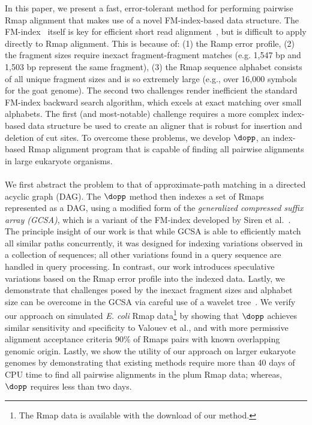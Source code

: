 \documentclass[doctor]{thesis}
\begin{document}
In this paper, we present a fast, error-tolerant method for performing pairwise Rmap alignment that makes use of a novel FM-index-based data structure. The FM-index~\cite{fm2005} itself is key for efficient short read alignment~\cite{BWA,bowtie}, but is difficult to apply directly to Rmap alignment.  This is because of: (1) the Ramp error profile, (2) the fragment sizes require inexact fragment-fragment matches (e.g. 1,547 bp and 1,503 bp represent the same fragment), (3) the Rmap sequence alphabet consists of all unique fragment sizes and is so extremely large (e.g., over 16,000 symbols for the goat genome).  The second two challenges render inefficient the standard FM-index backward search algorithm, which excels at exact matching over small alphabets. The first (and most-notable) challenge requires a more complex index-based data structure be used to create an aligner that is robust for insertion and deletion of cut sites. To overcome these problems, we develop $\dopp$, an index-based Rmap alignment program that is capable of finding all pairwise alignments in large eukaryote organisms.




\paragraph{}
We first abstract the problem to that of approximate-path matching in a directed 
acyclic graph (DAG). The $\dopp$ method then indexes a set of Rmaps represented
as a DAG, using a modified form of the {\em generalized compressed suffix array (GCSA)}, which is 
a variant of the FM-index developed by Siren et al.~\cite{dag_method}.  The principle insight of our work is that while GCSA is able to efficiently match all similar paths concurrently, it was designed for indexing variations observed in a collection of sequences; all other variations found in a query sequence are handled in query processing. In contrast, our work introduces speculative variations based on the Rmap error profile into the indexed data.  Lastly, we demonstrate that challenges posed by the inexact fragment sizes and alphabet size can be overcome in the GCSA via careful use of a wavelet tree~\cite{GNPtcs11}. 
We verify our approach on simulated {\em E. coli} Rmap data\footnote{The Rmap data is available with the download of our method.} by showing that $\dopp$ achieves similar sensitivity and specificity to Valouev et al., and with more permissive alignment acceptance criteria 90\% of Rmaps pairs with known overlapping genomic origin.  Lastly, we show the utility of our approach on larger eukaryote genomes by demonstrating that existing methods require more than 40 days of CPU time to find all pairwise alignments in the plum Rmap data; whereas, $\dopp$ requires less than two days. 
\end{document}
